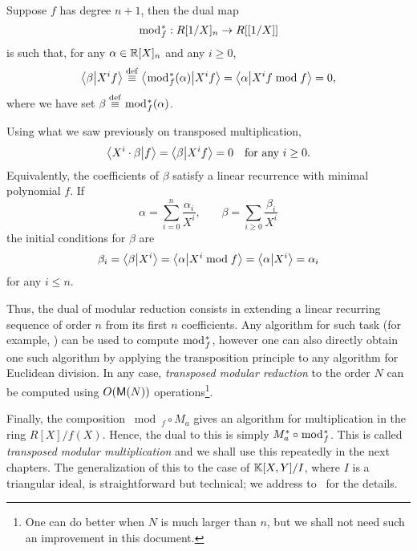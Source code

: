 Suppose $f$ has degree $n+1$, then the dual map
\begin{equation}
  \label{eq:233}
  \bmod_f^\ast:R[1/X]_n\rightarrow R[[1/X]]  
\end{equation}
is such that, for any $\alpha\in\mathbb{R}[X]_n$ and any $i\ge0$,
\begin{equation}
  \label{eq:234}
  \left\langle \beta \middle| X^if \right\rangle \overset{\mathrm{def}}{\equiv} \left\langle \bmod_f^\ast(\alpha) \middle| X^if \right\rangle = 
  \left\langle \alpha \middle| X^if\bmod f \right\rangle = 0
  \text{,}
\end{equation}
where we have set $\beta\overset{\mathrm{def}}{\equiv}\bmod_f^\ast(\alpha)$.

Using what we saw previously on transposed multiplication,
\begin{equation}
  \label{eq:235}
  \left\langle X^i\cdot\beta \middle| f \right\rangle = \left\langle \beta \middle| X^if \right\rangle = 0
  \quad\text{for any $i\ge0$.}
\end{equation}
Equivalently, the coefficients of $\beta$ satisfy a linear recurrence
with minimal polynomial $f$. If
\begin{equation}
  \label{eq:236}
  \alpha = \sum_{i=0}^{n}\frac{\alpha_i}{X^i}
  \text{,}\qquad
  \beta = \sum_{i\ge0}\frac{\beta_i}{X^i}
\end{equation}
the initial conditions for $\beta$ are
\begin{equation}
  \label{eq:237}
  \beta_i = \left\langle \beta \middle| X^i \right\rangle = \left\langle \alpha \middle| X^i\bmod f \right\rangle = \left\langle \alpha \middle| X^i \right\rangle = \alpha_i
\end{equation}
for any $i\le n$.

Thus, the dual of modular reduction consists in extending a linear
recurring sequence of order $n$ from its first $n$ coefficients. Any
algorithm for such task (for example, \cite[$\S$3]{shoup99}) can be
used to compute $\bmod_f^\ast$, however one can also directly obtain
one such algorithm by applying the transposition principle to any
algorithm for Euclidean division. In any case,
\textit{transposed modular
  reduction} to the order $N$ can be computed using $O(\mathsf{M}(N))$
operations\footnote{One can do better when $N$ is much larger than
  $n$, but we shall not need such an improvement in this document.}.

Finally, the composition $\bmod_f\circ M_a$ gives an algorithm for
multiplication in the ring $R[X]/f(X)$. Hence, the dual to this is
simply $M_a^\ast\circ\bmod_f^\ast$. This is called
\textit{transposed modular
  multiplication} and we shall use this repeatedly in the next
chapters. The generalization of this to the case of $\mathbb{K}[X,Y]/I$, where
$I$ is a triangular ideal, is straightforward but technical; we
address to~\cite[Corollary~2]{pascal+schost06} for the details.



